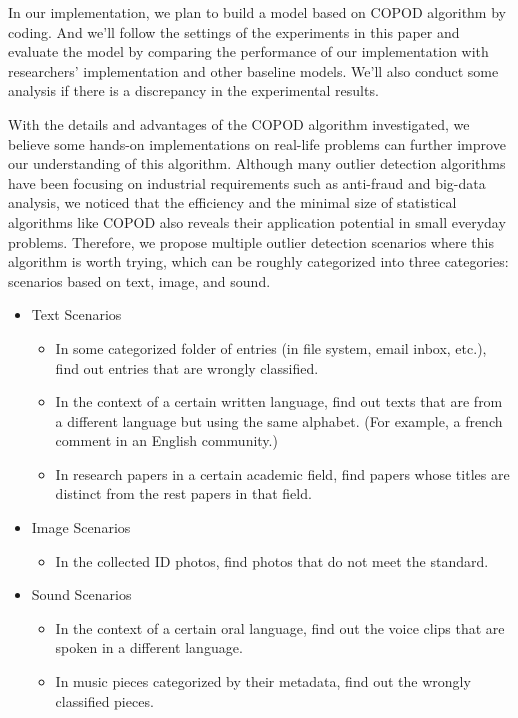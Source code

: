 \documentclass[12pt, a4paper, oneside]{article}
\begin{document}
\par In our implementation, we plan to build a model based on ​​COPOD algorithm by coding. And we’ll follow the settings of the experiments in this paper and evaluate the model by comparing the performance of our implementation with researchers’ implementation and other baseline models. We’ll also conduct some analysis if there is a discrepancy in the experimental results.
\par With the details and advantages of the COPOD algorithm investigated, we believe some hands-on implementations on real-life problems can further improve our understanding of this algorithm. Although many outlier detection algorithms have been focusing on industrial requirements such as anti-fraud and big-data analysis, we noticed that the efficiency and the minimal size of statistical algorithms like COPOD also reveals their application potential in small everyday problems. Therefore, we propose multiple outlier detection scenarios where this algorithm is worth trying, which can be roughly categorized into three categories: scenarios based on text, image, and sound. 
\par 
\begin{itemize}
\item Text Scenarios
	\begin{itemize}
	\item In some categorized folder of entries (in file system, email inbox, etc.), find out entries that are wrongly classified. 
	\item In the context of a certain written language, find out texts that are from a different language but using the same alphabet. (For example, a french comment in an English community.)
	\item In research papers in a certain academic field, find papers whose titles are distinct from the rest papers in that field. 
	\end{itemize}
\end{itemize}
\begin{itemize}
\item Image Scenarios
	\begin{itemize}
	\item In the collected ID photos, find photos that do not meet the standard.
	\end{itemize}
\end{itemize}
\begin{itemize}
\item Sound Scenarios
	\begin{itemize}
	\item In the context of a certain oral language, find out the voice clips that are spoken in a different language. 
	\item In music pieces categorized by their metadata, find out the wrongly classified pieces. 
	\end{itemize}
\end{itemize}
\end{document}
